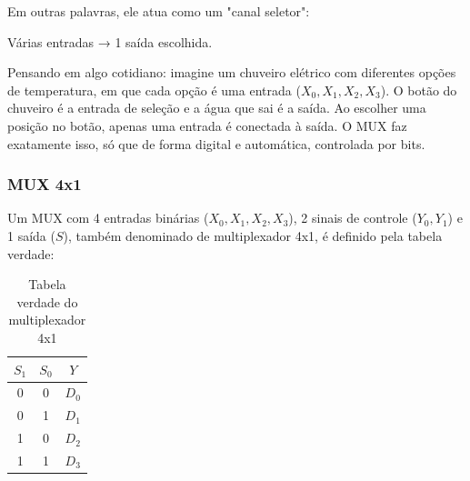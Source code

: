 \documentclass[12pt]{article}
\begin{document}
Em outras palavras, ele atua como um "canal seletor":
    
Várias entradas → 1 saída escolhida.

\begin{tcolorbox}[mynote, title=\textbf{Exemplo}]
Pensando em algo cotidiano: imagine um chuveiro elétrico com diferentes opções de temperatura, em que cada opção é uma entrada ($X_0, X_1, X_2, X_3$). O botão do chuveiro é a entrada de seleção e a água que sai é a saída. Ao escolher uma posição no botão, apenas uma entrada é conectada à saída. O MUX faz exatamente isso, só que de forma digital e automática,
controlada por bits.
\end{tcolorbox}

\subsubsection{MUX 4x1}

\begin{figure}[h]
\centering
{}
\end{figure}

Um MUX com 4 entradas binárias ($X_0, X_1, X_2, X_3$), 2 sinais de controle ($Y_0, Y_1$) e 1 saída ($S$), também denominado de multiplexador 4x1, é definido pela tabela verdade:
\begin{table}[h]
\centering

{\large
\begin{tabular}{|c|c|c|}
\hline
$S_1$ & $S_0$ & $Y$ \\ \hline
0 & 0 & $D_0$ \\ \hline
0 & 1 & $D_1$ \\ \hline
1 & 0 & $D_2$ \\ \hline
1 & 1 & $D_3$ \\ \hline
\end{tabular}
}

\caption{Tabela verdade do multiplexador 4x1}
\label{tab:mux4x1}
\end{table}
\end{document}
